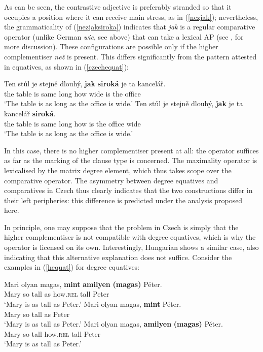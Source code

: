 As can be seen, the contrastive adjective is preferably stranded so that it occupies a position where it can receive main stress, as in (\ref{nezjak}); nevertheless, the grammaticality of (\ref{nezjaksiroka}) indicates that \textit{jak} is a regular comparative operator (unlike German \textit{wie}, see above) that can take a lexical AP (see \citealt{bacskaiatkari2015fdsl}, \citealt[93--94]{bacskaiatkari2018langsci} for more discussion). These configurations are possible only if the higher complementiser \textit{než} is present. This differs significantly from the pattern attested in equatives, as shown in (\ref{czechequat}):

\ea \label{czechequat}
\ea \gll Ten stůl je stejně dlouhý, \textbf{jak} \textbf{siroká} je ta kancelář.\\
the table is same long how wide is the office\\
\glt `The table is as long as the office is wide.'
\ex \gll Ten stůl je stejně dlouhý, \textbf{jak} je ta kancelář \textbf{siroká}.\\
the table is same long how is the office wide\\
\glt `The table is as long as the office is wide.'
\z
\z

In this case, there is no higher complementiser present at all: the operator suffices as far as the marking of the clause type is concerned. The maximality operator is lexicalised by the matrix degree element, which thus takes scope over the comparative operator. The asymmetry between degree equatives and comparatives in Czech thus clearly indicates that the two constructions differ in their left peripheries: this difference is predicted under the analysis proposed here.

In principle, one may suppose that the problem in Czech is simply that the higher complementiser is not compatible with degree equatives, which is why the operator is licensed on its own. Interestingly, Hungarian shows a similar case, also indicating that this alternative explanation does not suffice. Consider the examples in (\ref{hequat}) for degree equatives:

\ea \label{hequat}
\ea \gll Mari olyan magas, \textbf{mint} \textbf{amilyen} \textbf{(magas)} P\'eter. \label{asmintamilyen}\\
Mary so tall as how.\textsc{rel}  \phantom{\textbf{(}}tall Peter\\
\glt `Mary is as tall as Peter.'
\ex \gll Mari olyan magas, \textbf{mint} P\'eter. \label{asmint}\\
Mary so tall as Peter\\
\glt `Mary is as tall as Peter.'
\ex \gll Mari olyan magas, \textbf{amilyen} \textbf{(magas)} P\'eter. \label{asamilyen}\\
Mary so tall how.\textsc{rel} \phantom{\textbf{(}}tall Peter\\
\glt `Mary is as tall as Peter.'
\z
\z


